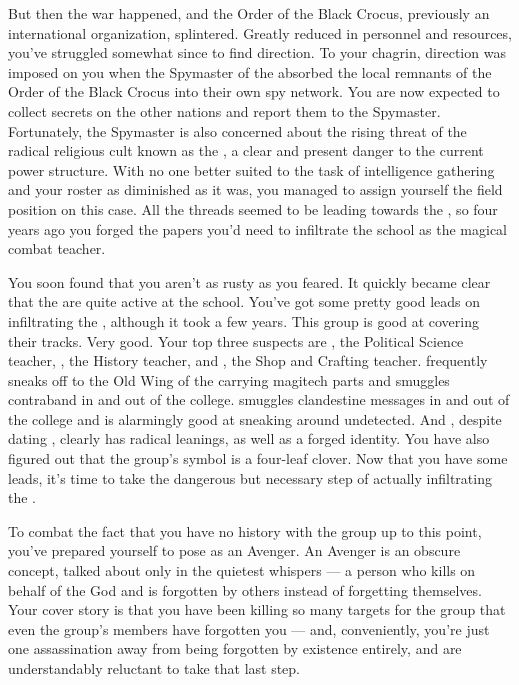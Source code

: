 \documentclass[char]{GL2020}
\begin{document}
But then the war happened, and the Order of the Black Crocus, previously an international organization, splintered. Greatly reduced in personnel and resources, you've struggled somewhat since to find direction. To your chagrin, direction was imposed on you when the Spymaster of the \pFarm{} absorbed the local remnants of the Order of the Black Crocus into their own spy network. You are now expected to collect secrets on the other nations and report them to the Spymaster. Fortunately, the Spymaster is also concerned about the rising threat of the radical religious cult known as the \pGoaties{}, a clear and present danger to the current power structure. With no one better suited to the task of intelligence gathering and your roster as diminished as it was, you managed to assign yourself the field position on this case. All the threads seemed to be leading towards the \pSchool{}, so four years ago you forged the papers you'd need to infiltrate the school as the magical combat teacher.

You soon found that you aren't as rusty as you feared. It quickly became clear that the \pGoaties{} are quite active at the school. You've got some pretty good leads on infiltrating the \pGoaties{}, although it took a few years. This group is good at covering their tracks. Very good. Your top three suspects are \cChupInventor{\intro}, the Political Science teacher, \cHistory{\intro}, the History teacher, and \cPirate{\intro}, the Shop and Crafting teacher. \cChupInventor{} frequently sneaks off to the Old Wing of the \pSc{} carrying magitech parts and smuggles contraband in and out of the college. \cHistory{} smuggles clandestine messages in and out of the college and is alarmingly good at sneaking around undetected. And \cPirate{}, despite dating \cPrince{\intro}, clearly has radical leanings, as well as a forged identity. You have also figured out that the group's symbol is a four-leaf clover. Now that you have some leads, it's time to take the dangerous but necessary step of actually infiltrating the \pGoaties{}.

To combat the fact that you have no history with the group up to this point, you've prepared yourself to pose as an Avenger. An Avenger is an obscure concept, talked about only in the quietest whispers — a person who kills on behalf of the God \cGenesis{\intro} and is forgotten by others instead of forgetting themselves. Your cover story is that you have been killing so many targets for the group that even the group's members have forgotten you — and, conveniently, you're just one assassination away from being forgotten by existence entirely, and are understandably reluctant to take that last step.
\end{document}
